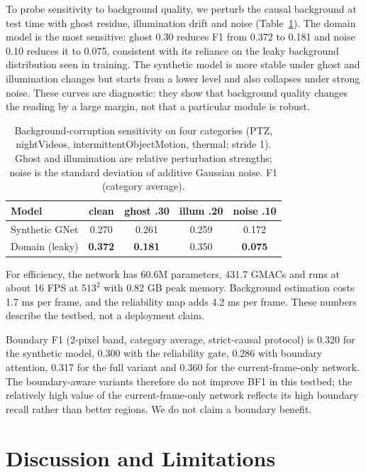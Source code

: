 \documentclass[sn-mathphys-num,iicol]{sn-jnl}
\begin{document}
To probe sensitivity to background quality, we perturb the causal background at
test time with ghost residue, illumination drift and noise (Table~\ref{tab:e8}).
The domain model is the most sensitive: ghost 0.30 reduces F1 from 0.372 to
0.181 and noise 0.10 reduces it to 0.075, consistent with its reliance on the
leaky background distribution seen in training. The synthetic model is more
stable under ghost and illumination changes but starts from a lower level and
also collapses under strong noise. These curves are diagnostic: they show that
background quality changes the reading by a large margin, not that a particular
module is robust.

\begin{table}[t]
\centering
\footnotesize
\setlength{\tabcolsep}{3pt}
\caption{Background-corruption sensitivity on four categories (PTZ,
nightVideos, intermittentObjectMotion, thermal; stride 1). Ghost and
illumination are relative perturbation strengths; noise is the standard
deviation of additive Gaussian noise. F1 (category average).}
\label{tab:e8}
\begin{tabular}{lcccc}
\toprule
Model & clean & ghost .30 & illum .20 & noise .10 \\
\midrule
Synthetic GNet & 0.270 & 0.261 & 0.259 & 0.172 \\
Domain (leaky) & \textbf{0.372} & \textbf{0.181} & 0.350 & \textbf{0.075} \\
\bottomrule
\end{tabular}
\end{table}

For efficiency, the network has 60.6M parameters, 431.7 GMACs and runs at about
16 FPS at $513^2$ with 0.82 GB peak memory. Background estimation costs 1.7 ms
per frame, and the reliability map adds 4.2 ms per frame. These numbers describe
the testbed, not a deployment claim.

Boundary F1 (2-pixel band, category average, strict-causal protocol) is 0.320
for the synthetic model, 0.300 with the reliability gate, 0.286 with boundary
attention, 0.317 for the full variant and 0.360 for the current-frame-only
network. The boundary-aware variants therefore do not improve BF1 in this
testbed; the relatively high value of the current-frame-only network reflects
its high boundary recall rather than better regions. We do not claim a boundary
benefit.

\section{Discussion and Limitations}\label{sec:disc}
\end{document}
